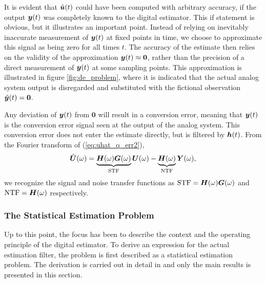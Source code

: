 It is evident that $\hat{\bm{u}}(t)$ could have been computed with arbitrary accuracy, if the output $\bm{y}(t)$ was completely known to the digital estimator. This if statement is obvious, but it illustrates an important point. Instead of relying on inevitably inaccurate measurement of $\bm{y}(t)$ at fixed points in time, we choose to approximate this signal as being zero for all times $t$. The accuracy of the estimate then relies on the validity of the approximation $\bm{y}(t) \approx \bm{0}$, rather than the precision of a direct measurement of $\bm{y}(t)$ at some sampling points. This approximation is illustrated in figure \ref{fig:de_problem}, where it is indicated that the actual analog system output is disregarded and substituted with the fictional observation $\tilde{\bm{y}}(t) = \bm{0}$.

Any deviation of $\bm{y}(t)$ from $\bm{0}$ will result in a conversion error, meaning that $\bm{y}(t)$ is the conversion error signal seen at the output of the analog system. This conversion error does not enter the estimate directly, but is filtered by $\bm{h}(t)$. From the Fourier transform of (\ref{eq:uhat_q_err2}),
\begin{equation}
    \label{eq:F_uhat_err2}
    \hat{\bm{U}}(\omega) =  \underbrace{\bm{H}(\omega) \bm{G}(\omega)}_\text{STF}\bm{U}(\omega) - \underbrace{\bm{H}(\omega)}_\text{NTF}\bm{Y}(\omega),
\end{equation}
we recognize the signal and noise transfer functions as $\text{STF} = \bm{H}(\omega) \bm{G}(\omega)$ and $\text{NTF} = \bm{H}(\omega)$ respectively.

\subsubsection*{The Statistical Estimation Problem}
Up to this point, the focus has been to describe the context and the operating principle of the digital estimator. To derive an expression for the actual estimation filter, the problem is first described as a statistical estimation problem. The derivation is carried out in detail in \cite{malmberg_thesis} and only the main results is presented in this section.

